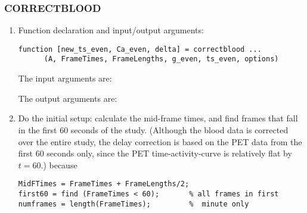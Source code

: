\subsubsection{CORRECTBLOOD}
\label{sec:correctblood_listing}

\begin{enumerate}

\item Function declaration and input/output arguments:
  \begin{verbatim}
function [new_ts_even, Ca_even, delta] = correctblood ...
      (A, FrameTimes, FrameLengths, g_even, ts_even, options)
  \end{verbatim}
The input arguments are:
%
The output arguments are:


\item Do the initial setup: calculate the mid-frame times, and find
  frames that fall in the first 60 seconds of the study.  (Although
  the blood data is corrected over the entire study, the delay
  correction is based on the PET data from the first 60 seconds only,
  since the PET time-activity-curve is relatively flat by $t=60$.)
  because
\begin{verbatim}
MidFTimes = FrameTimes + FrameLengths/2;
first60 = find (FrameTimes < 60);       % all frames in first
numframes = length(FrameTimes);         %  minute only
\end{verbatim}


\end{enumerate}
